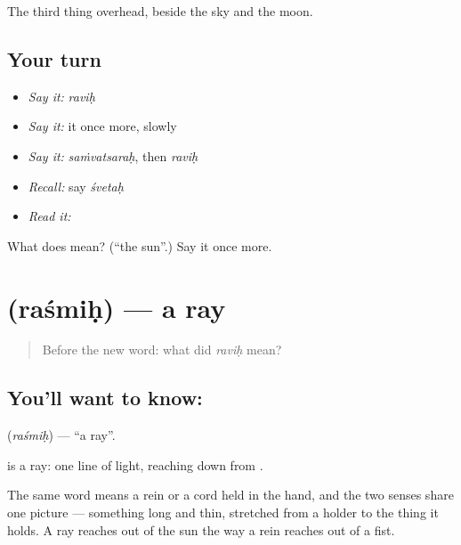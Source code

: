 \begin{grammarlens}[title={What you've built}]
The third thing overhead, beside the sky and the moon.
\end{grammarlens}

\subsection*{Your turn}
\begin{itemize}
\raggedright
  \item \emph{Say it:} \emph{raviḥ}
  \item \emph{Say it:} it once more, slowly
  \item \emph{Say it:} \emph{saṁvatsaraḥ}, then \emph{raviḥ}
  \item \emph{Recall:} say \emph{śvetaḥ}
  \item \emph{Read it:} \textbf{}
\end{itemize}

\begin{tcolorbox}[breakable,colback=teal!4,colframe=teal!35!black,title={Before you move on}]
What does  mean? (\textquotedblleft{}the sun\textquotedblright{}.) Say it once more.
\end{tcolorbox}
\section[\texorpdfstring{\sk{रश्मिः} (raśmiḥ)}{रश्मिः (raśmiḥ)}]{ (raśmiḥ) — a ray}

\label{lesson:SA-C46-ray}



\begin{quote}
Before the new word: what did \emph{raviḥ} mean?
\end{quote}

\subsection*{You'll want to know: }
\textbf{} (\emph{raśmiḥ}) — \textquotedblleft{}a ray\textquotedblright{}.

\textbf{} is a ray: one line of light, reaching down from .

The same word means a rein or a cord held in the hand, and the two senses share one picture — something long and thin, stretched from a holder to the thing it holds. A ray reaches out of the sun the way a rein reaches out of a fist.

